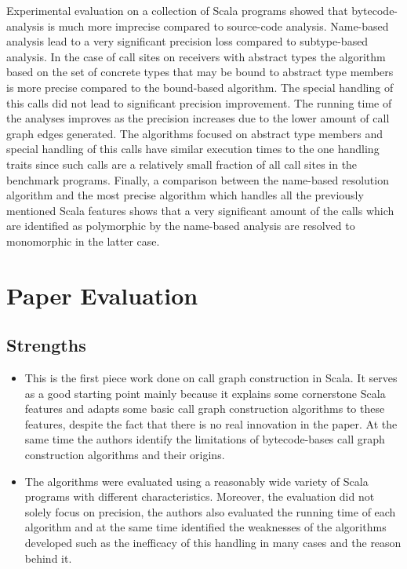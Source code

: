 \documentclass{article} \usepackage{hyperref} \usepackage{graphicx}
\begin{document}
Experimental evaluation on a collection of Scala programs showed that
bytecode-analysis is much more imprecise compared to source-code
analysis. Name-based analysis lead to a very significant precision
loss compared to subtype-based analysis. In the case of call sites on
receivers with abstract types the algorithm based on the set of
concrete types that may be bound to abstract type members is more
precise compared to the bound-based algorithm. The special handling of
this calls did not lead to significant precision improvement. The
running time of the analyses improves as the precision increases due
to the lower amount of call graph edges generated. The algorithms
focused on abstract type members and special handling of this calls
have similar execution times to the one handling traits since such
calls are a relatively small fraction of all call sites in the
benchmark programs. Finally, a comparison between the name-based
resolution algorithm and the most precise algorithm which handles all
the previously mentioned Scala features shows that a very significant
amount of the calls which are identified as polymorphic by the
name-based analysis are resolved to monomorphic in the latter case.

\section{Paper Evaluation}
\subsection{Strengths}
\begin{itemize}
\item This is the first piece work done on call graph construction in
  Scala. It serves as a good starting point mainly because it  explains
  some cornerstone Scala features and adapts some basic call graph
  construction algorithms to these features, despite the fact that
  there is no real innovation in the paper. At the same time the
  authors identify the limitations of bytecode-bases call graph
  construction algorithms and their origins.
\item The algorithms were evaluated using a reasonably wide variety of
  Scala programs with different characteristics. Moreover, the
  evaluation did not solely focus on precision, the authors also
  evaluated the running time of each algorithm and at the same time
  identified the weaknesses of the algorithms developed such as the
  inefficacy of this handling in many cases and the reason behind it.
\end{itemize}
\end{document}
